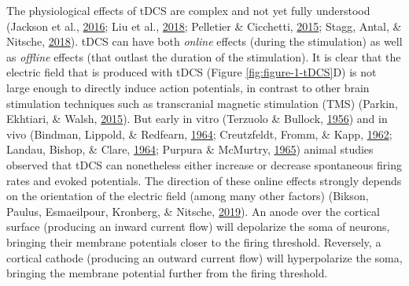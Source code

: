 \documentclass[12pt,a4paper,]{memoir}
\begin{document}
The physiological effects of tDCS are complex and not yet fully understood (Jackson et al., \protect\hyperlink{ref-Jackson2016}{2016}; Liu et al., \protect\hyperlink{ref-Liu2018}{2018}; Pelletier \& Cicchetti, \protect\hyperlink{ref-Pelletier2015}{2015}; Stagg, Antal, \& Nitsche, \protect\hyperlink{ref-Stagg2018}{2018}). tDCS can have both \emph{online} effects (during the stimulation) as well as \emph{offline} effects (that outlast the duration of the stimulation). It is clear that the electric field that is produced with tDCS (Figure \ref{fig:figure-1-tDCS}D) is not large enough to directly induce action potentials, in contrast to other brain stimulation techniques such as transcranial magnetic stimulation (TMS) (Parkin, Ekhtiari, \& Walsh, \protect\hyperlink{ref-Parkin2015}{2015}). But early in vitro (Terzuolo \& Bullock, \protect\hyperlink{ref-Terzuolo1956}{1956}) and in vivo (Bindman, Lippold, \& Redfearn, \protect\hyperlink{ref-Bindman1964}{1964}; Creutzfeldt, Fromm, \& Kapp, \protect\hyperlink{ref-Creutzfeldt1962}{1962}; Landau, Bishop, \& Clare, \protect\hyperlink{ref-Landau1964}{1964}; Purpura \& McMurtry, \protect\hyperlink{ref-Purpura1965}{1965}) animal studies observed that tDCS can nonetheless either increase or decrease spontaneous firing rates and evoked potentials. The direction of these online effects strongly depends on the orientation of the electric field (among many other factors) (Bikson, Paulus, Esmaeilpour, Kronberg, \& Nitsche, \protect\hyperlink{ref-Bikson2019}{2019}). An anode over the cortical surface (producing an inward current flow) will depolarize the soma of neurons, bringing their membrane potentials closer to the firing threshold. Reversely, a cortical cathode (producing an outward current flow) will hyperpolarize the soma, bringing the membrane potential further from the firing threshold.
\end{document}
